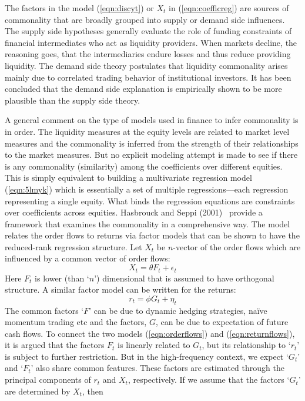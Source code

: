 The factors in the model (\ref{eqn:discyt}) or $X_t$ in (\ref{eqn:coefficreg}) are sources of commonality that are broadly grouped into supply or demand side influences. The supply side hypotheses generally evaluate the role of funding constraints of financial intermediates who act as liquidity providers. When markets decline, the reasoning goes, that the intermediaries endure losses and thus reduce providing liquidity. The demand side theory postulates that liquidity commonality arises mainly due to correlated trading behavior of institutional investors. It has been concluded that the demand side explanation is empirically shown to be more plausible than the supply side theory. 


A general comment on the type of models used in finance to infer commonality is in order. The liquidity measures at the equity levels are related to market level measures and the commonality is inferred from the strength of their relationships to the market measures. But no explicit modeling attempt is made to see if there is any commonality (similarity) among the coefficients over different equities. This is simply equivalent to building a multivariate regression model (\ref{eqn:5lmyk}) which is essentially a set of multiple regressions---each regression representing a single equity. What binds the regression equations are constraints over coefficients across equities. Hasbrouck and Seppi (2001)~\cite{seppi2001} provide a framework that examines the commonality in a comprehensive way. The model relates the order flows to returns via factor models that can be shown to have the reduced-rank regression structure. Let $X_t$ be $n$-vector of the order flows which are influenced by a common vector of order flows:
	\begin{equation}\label{eqn:orderflows}
	X_t= \theta F_t + \epsilon_t
	\end{equation}
Here $F_t$ is lower (than `$n$') dimensional that is assumed to have orthogonal structure. A similar factor model can be written for the returns:
	\begin{equation}\label{eqn:returnflows}
	r_t= \phi G_t + \eta_t
	\end{equation}
The common factors `$F$' can be due to dynamic hedging strategies, na\"{i}ve momentum trading etc and the factors, $G$, can be due to expectation of future cash flows. To connect the two models (\ref{eqn:orderflows}) and (\ref{eqn:returnflows}), it is argued that the factors $F_t$ is linearly related to $G_t$, but its relationship to `$r_t$' is subject to further restriction. But in the high-frequency context, we expect `$G_t$' and `$F_t$' also share common features. These factors are estimated through the principal components of $r_t$ and $X_t$, respectively. If we assume that the factors `$G_t$' are determined by $X_t$, then
